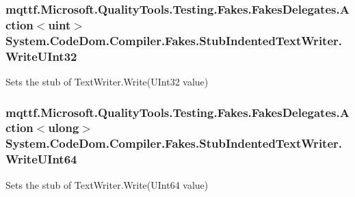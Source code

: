 \hypertarget{class_system_1_1_code_dom_1_1_compiler_1_1_fakes_1_1_stub_indented_text_writer_ab596ebfb2de1c41b1caff2ea246f45de}{
\subsubsection[{Write\-U\-Int32}]{\setlength{\rightskip}{0pt plus 5cm}mqttf.\-Microsoft.\-Quality\-Tools.\-Testing.\-Fakes.\-Fakes\-Delegates.\-Action$<$uint$>$ System.\-Code\-Dom.\-Compiler.\-Fakes.\-Stub\-Indented\-Text\-Writer.\-Write\-U\-Int32}}\label{class_system_1_1_code_dom_1_1_compiler_1_1_fakes_1_1_stub_indented_text_writer_ab596ebfb2de1c41b1caff2ea246f45de}


Sets the stub of Text\-Writer.\-Write(\-U\-Int32 value)

\hypertarget{class_system_1_1_code_dom_1_1_compiler_1_1_fakes_1_1_stub_indented_text_writer_a3972b3bf454aab23d78cd4f5437bcf1e}{
\subsubsection[{Write\-U\-Int64}]{\setlength{\rightskip}{0pt plus 5cm}mqttf.\-Microsoft.\-Quality\-Tools.\-Testing.\-Fakes.\-Fakes\-Delegates.\-Action$<$ulong$>$ System.\-Code\-Dom.\-Compiler.\-Fakes.\-Stub\-Indented\-Text\-Writer.\-Write\-U\-Int64}}\label{class_system_1_1_code_dom_1_1_compiler_1_1_fakes_1_1_stub_indented_text_writer_a3972b3bf454aab23d78cd4f5437bcf1e}


Sets the stub of Text\-Writer.\-Write(\-U\-Int64 value)



